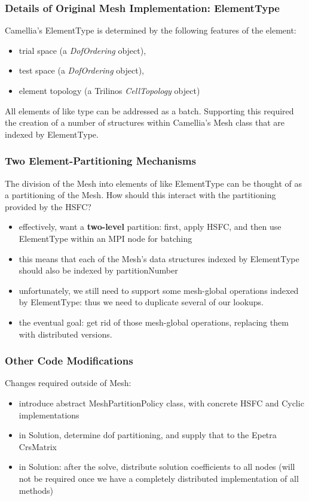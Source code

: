 \documentclass[mathserif]{beamer}
\begin{document}
\begin{frame}
\frametitle{Details of Original Mesh Implementation: ElementType}
Camellia's ElementType is determined by the following features of the element:
\begin{itemize}
\item trial space (a \emph{DofOrdering} object),
\item test space (a \emph{DofOrdering} object),
\item element topology (a Trilinos \emph{CellTopology} object)
\end{itemize}

All elements of like type can be addressed as a batch.  Supporting this required the creation of a number of structures within Camellia's Mesh class that are indexed by ElementType.
\end{frame}

\begin{frame}
\frametitle{Two Element-Partitioning Mechanisms}
The division of the Mesh into elements of like ElementType can be thought of as a partitioning of the Mesh.  How should this interact with the partitioning provided by the HSFC?
\begin{itemize}
\item effectively, want a {\bf two-level} partition: first, apply HSFC, and then use ElementType within an MPI node for batching
\item this means that each of the Mesh's data structures indexed by ElementType should also be indexed by partitionNumber
\item unfortunately, we still need to support some mesh-global operations indexed by ElementType: thus we need to duplicate several of our lookups.
\item the eventual goal: get rid of those mesh-global operations, replacing them with distributed versions.
\end{itemize}
\end{frame}

\begin{frame}
\frametitle{Other Code Modifications}
Changes required outside of Mesh:
\begin{itemize}
\item introduce abstract MeshPartitionPolicy class, with concrete HSFC and Cyclic implementations
\item in Solution, determine dof partitioning, and supply that to the Epetra CrsMatrix
\item in Solution: after the solve, distribute solution coefficients to all nodes (will not be required once we have a  completely distributed implementation of all methods)
\end{itemize}
\end{frame}
\end{document}
